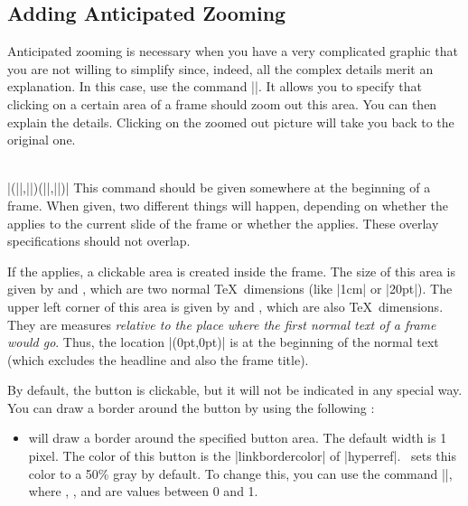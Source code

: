 \subsection{Adding Anticipated Zooming}
\label{section-zooming}

Anticipated zooming is necessary when you have a very complicated graphic that you are not willing to simplify since, indeed, all the complex details merit an explanation. In this case, use the command |\framezoom|. It allows you to specify that clicking on a certain area of a frame should zoom out this area. You can then explain the details. Clicking on the zoomed out picture will take you back to the original one.

\begin{command}{\framezoom{}\\|(||,||)(||,||)|}
  This command should be given somewhere at the beginning of a frame. When given, two different things will happen, depending on whether the  applies to the current slide of the frame or whether the  applies. These overlay specifications should not overlap.

  If the  applies, a clickable area is created inside the frame. The size of this area is given by  and , which are two normal \TeX\ dimensions (like |1cm| or |20pt|). The upper left corner of this area is given by  and , which are also \TeX\ dimensions. They are measures \emph{relative to the place where the first normal text of a frame would go}. Thus, the location |(0pt,0pt)| is at the beginning of the normal text (which excludes the headline and also the frame title).

  By default, the button is clickable, but it will not be indicated in any special way. You can draw a border around the button by using the following :
  \begin{itemize}
  \item
     will draw a border around the specified button area. The default width is 1 pixel. The color of this  button is the |linkbordercolor| of |hyperref|. \beamer\ sets this color to a 50\% gray by default. To change this, you can use the command ||, where , , and  are values between 0 and 1.
  \end{itemize}


\end{command}
